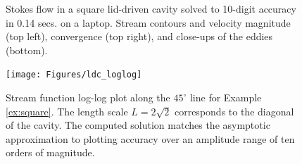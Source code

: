 \begin{example}
\begin{figure}[H]
\caption{Stokes flow in a square lid-driven cavity solved to 10-digit accuracy in 0.14 secs. on a laptop. Stream contours and velocity magnitude (top left), convergence (top right), and close-ups of the eddies (bottom).}
\label{fig:ldc}
\end{figure} 
\begin{figure}[H]
\centering
\texttt{[image: Figures/ldc\_loglog]}
\caption{Stream function log-log plot along the $45^\circ$ line for Example \ref{ex:square}. The length scale $L=2\sqrt{2}$ corresponds to the diagonal of the cavity. The computed solution matches the asymptotic approximation to plotting accuracy over an amplitude range of ten orders of magnitude.}
\label{fig:ldc_loglog}
\end{figure}

\end{example}


